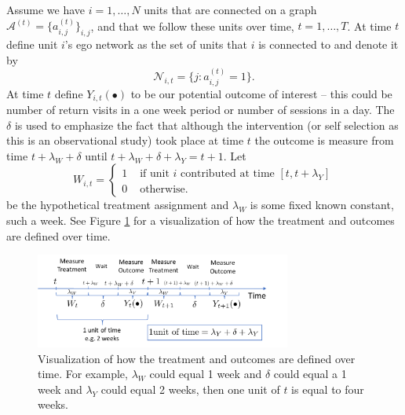\documentclass[a4paper]{article}
\begin{document}
Assume we have $i=1,\dots, N$ units that are connected on a graph $\mathcal{ A}^{(t)} = \{a_{i,j}^{(t)}\}_{i,j}$, and that we follow these units over time, $t = 1, \dots, T$. At time $t$ define unit $i$'s ego network as the set of units that $i$ is connected to and denote it by 
\[
  \mathcal{N}_{i,t} = \{j: a_{i,j}^{(t)} = 1\}.
\]
At time $t$ define $Y_{i,t}(\bullet)$ to be our potential outcome of interest -- this could be number of return visits in a one week period or number of sessions in a day. The $\delta$ is used to emphasize the fact that although the intervention (or self selection as this is an observational study) took place at time $t$ the outcome is measure from time $t + \lambda_W + \delta $ until $t + \lambda_W + \delta +\lambda_Y = t+1$. 
Let
\[
  W_{i,t} = \begin{cases} 
              1 & \text{ if unit $i$ contributed at time $[t, t + \lambda_Y]$}  \\
              0 & \text{ otherwise.} 
            \end{cases}
\]
be the hypothetical treatment assignment and $\lambda_W$ is some fixed known constant, such a week. See Figure \ref{fig:time_def}
for a visualization of how the treatment and outcomes are defined over time. 

\begin{figure}[t]
	\centering
	\includegraphics[width=0.75\textwidth]{time_figure_long_v3}
	\caption{Visualization of how the treatment and outcomes are defined over time. For example, $\lambda_W$ could equal 1 week and $\delta$ could equal a 1 week and $\lambda_Y$ could equal 2 weeks, then one unit of $t$ is equal to four weeks.}
	\label{fig:time_def}
\end{figure}
\end{document}
